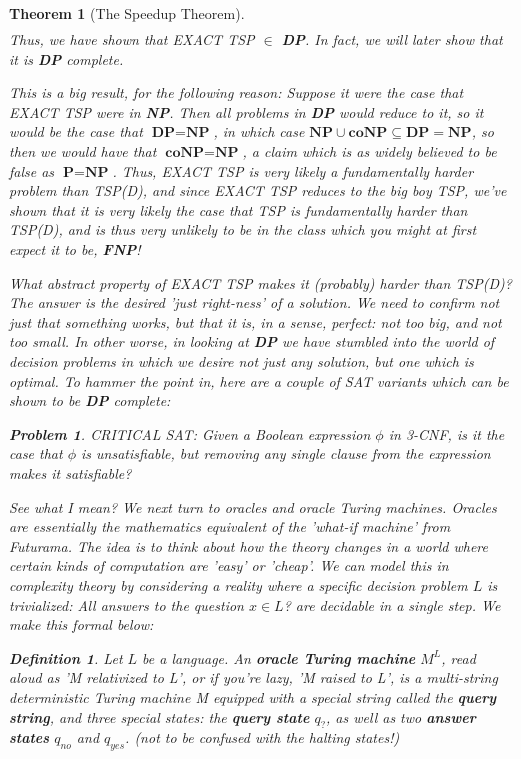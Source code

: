 \documentclass{article}
\theoremstyle{definition}
\newtheorem{definition}{Definition}[section]
\newtheorem{problem}{Problem}
\theoremstyle{plain}
\theoremstyle{theorem}
\newtheorem{theorem}{Theorem}[section]
\begin{document}
\begin{theorem}[The Speedup Theorem]
\begin{align}
\end{align}
Thus, we have shown that EXACT TSP $\in$ \textbf{DP}. In fact, we will later show that it is \textbf{DP} complete.
\par This is a big result, for the following reason: Suppose it were the case that EXACT TSP were in \textbf{NP}. Then all problems in \textbf{DP} would reduce to it, so it would be the case that $\textbf{DP} = \textbf{NP}$, in which case $\textbf{NP} \cup \textbf{coNP} \subseteq \textbf{DP} = \textbf{NP}$, so then we would have that $\textbf{coNP} = \textbf{NP}$, a claim which is as widely believed to be false as $\textbf{P}=\textbf{NP}$. Thus, EXACT TSP is \textit{very} likely a fundamentally harder problem than TSP(D), and since EXACT TSP reduces to the big boy TSP, we've shown that it is \textit{very} likely the case that TSP is fundamentally harder than TSP(D), and is thus \textit{very} unlikely to be in the class which you might at first expect it to be, \textbf{FNP}!
\par What abstract property of EXACT TSP makes it (probably) harder than TSP(D)? The answer is the desired 'just right-ness' of a solution. We need to confirm not just that something works, but that it is, in a sense, perfect: not too big, and not too small. In other worse, in looking at \textbf{DP} we have stumbled into the world of decision problems in which we desire not just any solution, but one which is \textit{optimal}. To hammer the point in, here are a couple of SAT variants which can be shown to be \textbf{DP} complete:
\begin{problem}
    CRITICAL SAT: Given a Boolean expression $\phi$ in 3-CNF, is it the case that $\phi$ is unsatisfiable, but removing any single clause from the expression makes it satisfiable?
\end{problem}
See what I mean?
We next turn to oracles and oracle Turing machines. Oracles are essentially the mathematics equivalent of the 'what-if machine' from Futurama. The idea is to think about how the theory changes in a world where certain kinds of computation are 'easy' or 'cheap'. We can model this in complexity theory by considering a reality where a specific decision problem $L$ is trivialized: All answers to the question $x \in L$? are decidable in a single step. We make this formal below:
\begin{definition}
    Let $L$ be a language. An \textbf{oracle Turing machine} $M^L$, read aloud as 'M \textit{relativized} to L', or if you're lazy, 'M raised to L', is a multi-string deterministic Turing machine M equipped with a special string called the \textbf{query string}, and three special states: the \textbf{query state} $q_?$, as well as two \textbf{answer states} $q_{no}$ and $q_{yes}$. (not to be confused with the halting states!)

\end{definition}
\end{theorem}
\end{document}
